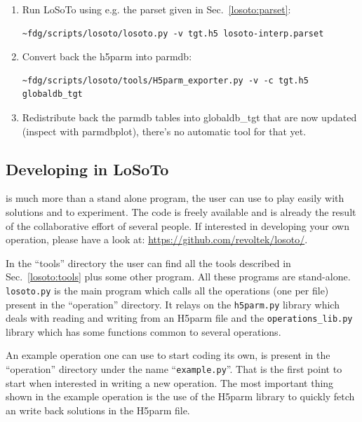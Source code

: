 \documentclass[]{article}
\begin{document}
\begin{enumerate}
\item Run LoSoTo using e.g. the parset given in Sec.~\ref{losoto:parset}:
\begin{verbatim}
~fdg/scripts/losoto/losoto.py -v tgt.h5 losoto-interp.parset
\end{verbatim}

\item Convert back the h5parm into parmdb:
\begin{verbatim}
~fdg/scripts/losoto/tools/H5parm_exporter.py -v -c tgt.h5 globaldb_tgt
\end{verbatim}

\item Redistribute back the parmdb tables into globaldb\_tgt that are now updated (inspect with parmdbplot), there's no automatic tool for that yet.
\end{enumerate}

\subsection{Developing in LoSoTo}
\label{losoto:developing}
\losoto{} is much more than a stand alone program, the user can use \losoto{} to play easily with solutions and to experiment. The code is freely available and is already the result of the collaborative effort of several people. If interested in developing your own operation, please have a look at: \url{https://github.com/revoltek/losoto/}.

In the ``tools'' directory the user can find all the tools described in Sec.~\ref{losoto:tools} plus some other program. All these programs are stand-alone. \texttt{losoto.py} is the main program which calls all the operations (one per file) present in the ``operation'' directory. It relays on the \texttt{h5parm.py} library which deals with reading and writing from an H5parm file and the \texttt{operations\_lib.py} library which has some functions common to several operations.

An example operation one can use to start coding its own, is present in the ``operation'' directory under the name ``\texttt{example.py}''. That is the first point to start when interested in writing a new operation. The most important thing shown in the example operation is the use of the H5parm library to quickly fetch an write back solutions in the H5parm file.
\end{document}
